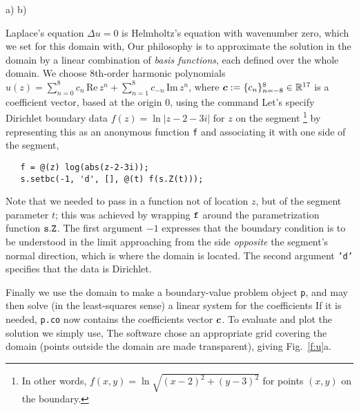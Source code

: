 \bfi %
a)
b)
\efi

Laplace's equation $\Delta u = 0$ is Helmholtz's equation with wavenumber
zero, which we set for this domain with,
Our philosophy is
to approximate the solution in the domain by a linear combination of
{\em basis functions}, each defined over the whole domain.
We choose 8th-order harmonic polynomials
$u(z) = \sum_{n=0}^{8} c_n \,\mbox{Re}\,z^n +
\sum_{n=1}^{8} c_{-n}\,\mbox{Im}\,z^n$, where ${\bm c}:=\{c_n\}_{n=-8}^{8}
\in\mathbb{R}^{17}$
is a coefficient vector, based at the origin 0,
using the command
Let's specify Dirichlet boundary data $f(z) = 
\ln |z-2-3i|$ for
$z$ on the segment%
  \footnote{In other words, $f(x,y) = \ln \sqrt{(x-2)^2+(y-3)^2}$
    for points $(x,y)$ on the boundary.}
by representing this as an anonymous function {\tt f}
and associating it with one side of the segment,
\begin{verbatim}
   f = @(z) log(abs(z-2-3i));
   s.setbc(-1, 'd', [], @(t) f(s.Z(t)));
\end{verbatim}
Note that we needed to pass in a function not of location $z$,
but of the segment parameter $t$;
this was achieved by
wrapping ${\tt f}$ around the parametrization function ${\tt s.Z}$.
The first argument $-1$ expresses that the boundary condition is to be
understood in the limit approaching from the side {\em opposite} the
segment's normal direction, which is where the domain is located.
The second argument {\tt 'd'} specifies that the data is Dirichlet.
 
Finally we use the domain to make a boundary-value
problem object {\tt p},
and may then solve (in the least-squares sense)
a linear system for the coefficients
If it is needed, {\tt p.co} now contains the coefficients vector ${\bm c}$.
To evaluate and plot the solution we simply use,
The software chose an appropriate grid covering the domain
(points outside the domain are made transparent), giving Fig.~\ref{f:u}a.
